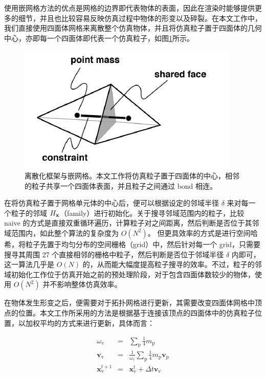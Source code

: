 使用嵌网格方法的优点是网格的边界即代表物体的表面，因此在渲染时能够提供更多的细节，并且也比较容易反映仿真过程中物体的形变以及碎裂。在本文工作中，我们直接使用四面体网格来离散整个仿真物体，并且将仿真粒子置于四面体的几何中心，亦即每一个四面体即代表一个仿真粒子，如图\ref{embedded_mesh}所示。

\begin{figure}[!htb]
  \centering
  \captionsetup{justification=centering}
  \includegraphics[width=0.6\linewidth]{chap/image/embedded_mesh}

  \caption{\label{embedded_mesh}
           离散化框架与嵌网格。本文工作将仿真粒子置于四面体的中心，相邻的粒子共享一个四面体表面，并且粒子之间通过 bond 相连。
          }
\end{figure}

在将仿真粒子置于网格单元体的中心后，便可以根据设定的邻域半径 $\delta$ 来对每一个粒子的邻域 $H_{\mathbf{x}}$（family）进行初始化。关于搜寻邻域范围内的粒子，比较 naive 的方式是直接双重循环遍历，计算粒子对之间距离，然后判断是否位于其邻域范围内，如此整个算法的复杂度为 $O(N^2)$。 但更具效率的方式是进行空间哈希，将粒子先置于均匀分布的空间栅格（grid）中，然后针对每一个 grid，只需要搜寻其周围 27 个直接相邻的栅格中粒子，然后判断是否位于邻域半径 $\delta$ 内即可，这一算法几乎是 $O(N)$ 的，从而能大幅度提高粒子搜寻的效率。不过，粒子的邻域初始化工作位于仿真开始之前的预处理阶段，对于包含四面体数较少的物体，使用 $O(N^2)$ 并不影响整体仿真效率。

在物体发生形变之后，便需要对于拓扑网格进行更新，其需要改变四面体网格中顶点的位置。本文工作所采用的方法是根据基于连接该顶点的四面体中的仿真粒子位置，以加权平均的方式来进行更新，具体而言：

\begin{eqnarray}
\omega_{\mathrm{v}} &=& \sum_{\mathrm{p}} \frac{1}{4}m_{\mathrm{p}}\\
\textbf{v}_{\mathrm{v}} &=& \frac{1}{\omega_{\mathrm{v}}}\sum_{\mathrm{p}}\frac{1}{4}m_{\mathrm{p}}\textbf{v}_{\mathrm{p}}\\
\mathbf{x}_{\mathrm{v}}^{t+1} &=& \mathbf{x}_{\mathrm{v}}^{t} + \Delta t\textbf{v}_{\mathrm{v}}
\end{eqnarray}

